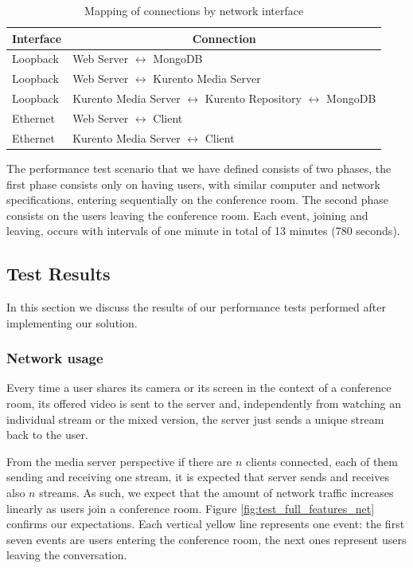   \begin{table}
\centering
\caption{Mapping of connections by network interface}
\label{table:interfacemap}
\begin{tabular}{|l|l|}
\hline
\multicolumn{1}{|c|}{\textbf{Interface}} & \multicolumn{1}{c|}{\textbf{Connection}}         \\ \hline
Loopback & Web Server $\leftrightarrow$ MongoDB  \\ \hline
Loopback & Web Server $\leftrightarrow$ Kurento Media Server  \\ \hline
Loopback & Kurento Media Server $\leftrightarrow$ Kurento Repository $\leftrightarrow$ MongoDB  \\ \hline
Ethernet & Web Server $\leftrightarrow$ Client\\ \hline
Ethernet & Kurento Media Server $\leftrightarrow$ Client\\ \hline
\end{tabular}
\end{table}


      The performance test scenario that we have defined consists of two phases, the first phase consists only on having users, with similar computer and network specifications, entering sequentially on the conference room. The second phase consists on the users leaving the conference room. Each event, joining and leaving, occurs with intervals of one minute in total of 13 minutes (780 seconds).

  


\subsection{Test Results}
  
      In this section we discuss the results of our performance tests performed after implementing our solution.
\subsubsection{Network usage}

      Every time a user shares its camera or its screen in the context of a conference room, its offered video is sent to the server and, independently from watching an individual stream or the mixed version, the server just sends a unique stream back to the user.

      From the media server perspective if there are $n$ clients connected, each of them sending and receiving one stream, it is expected that server sends and receives also $n$ streams. As such, we expect that the amount of network traffic increases linearly as users join a conference room. Figure \ref{fig:test_full_features_net} confirms our expectations. Each vertical yellow line represents one event: the first seven events are users entering the conference room, the next ones represent users leaving the conversation. 
      

